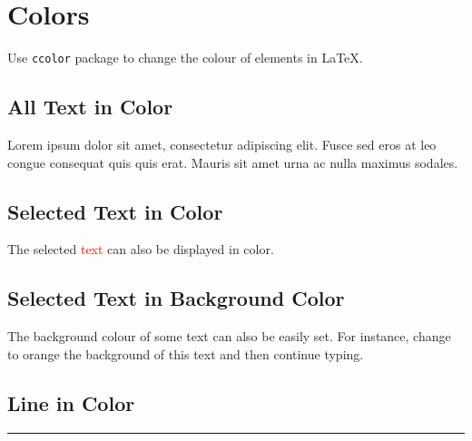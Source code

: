 \documentclass{article}
\begin{document}
\section{Colors}
Use \texttt{ccolor} package to change the colour of elements in \LaTeX.

\subsection{All Text in Color}
{\color{ForestGreen}
Lorem ipsum dolor sit amet, consectetur adipiscing elit. Fusce sed eros at leo congue consequat quis quis erat. Mauris
sit amet urna ac nulla maximus sodales.}

\subsection{Selected Text in Color}
The selected \textcolor{red}{text} can also be displayed in color.

\subsection{Selected Text in Background Color}
The background colour of some text can also be easily set. For instance, change to orange the background of
\colorbox{BurntOrange}{this text} and then continue typing.

\subsection{Line in Color}
{\color{RubineRed} \rule{\linewidth}{0.5mm} }
\end{document}
